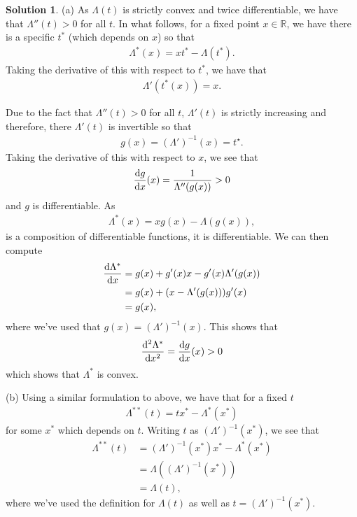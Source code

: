 \documentclass[12pt]{article}
\newcommand{\bbR}{\mathbb{R}}
\def\rd{{\rm d}}
\theoremstyle{definition}
\newtheorem{sol}{Solution}
\theoremstyle{remark}
\begin{document}
\begin{sol}
    (a) As $\Lambda(t)$ is strictly convex and twice differentiable, we have that $\Lambda''(t) > 0$ for all $t$. In what follows, for a fixed point $x \in \bbR$, we have there is a specific $t ^{*}$ (which depends on $x$) so that
    \begin{align*}
        \Lambda^{*}(x) = xt^{*} - \Lambda(t^{*}).
    \end{align*}
Taking the derivative of this with respect to $t^{*}$, we have that 
\begin{align*}
    \Lambda'(t^{*}(x)) = x.
\end{align*}

Due to the fact that $\Lambda''(t) > 0$ for all $t$, $\Lambda'(t)$ is strictly increasing and therefore, there  $\Lambda'(t)$ is invertible so that 
 \begin{align*}
     g(x) = (\Lambda')^{-1}(x) = t^{\star}.
\end{align*}
Taking the derivative of this with respect to $x$, we see that
\begin{align*}
    \frac{\rd g}{\rd x} (x) = \frac{1}{\Lambda''(g(x))} > 0
\end{align*}
and $g$ is differentiable. As 
\begin{align*}
    \Lambda^{*}(x) = x g(x) - \Lambda( g(x) ),
\end{align*}
is a composition of differentiable functions, it is differentiable. We can then compute
\begin{align*}
    \frac{\rd \Lambda^{*}}{\rd x} &= g(x) + g'(x)x - g'(x)\Lambda'(g(x))\\
                                  &= g(x) + (x - \Lambda'(g(x)) ) g'(x)\\
                                  &= g(x),
\end{align*}
where we've used that $g(x) = (\Lambda')^{-1}(x)$. This shows that 
\begin{align*}
   \frac{\rd^{2} \Lambda^{*}}{\rd x^{2}} = \frac{\rd g}{\rd x} (x) > 0
\end{align*}
which shows that $\Lambda^{*}$ is convex.

(b) Using a similar formulation to above, we have that for a fixed $t$
    \begin{align*}
        \Lambda^{**}(t) = t x^{*} - \Lambda^{*}(x^{*}) 
    \end{align*}
    for some $x^{*}$ which depends on $t$. Writing $t$ as $(\Lambda')^{-1}(x^{*})$, we see that
    \begin{align*}
        \Lambda^{**}(t) &= (\Lambda')^{-1}(x^{*}) x^{*} - \Lambda^{*}(x^{*}) \\
                        &= \Lambda( (\Lambda')^{-1}(x^{*}) )\\
                        &= \Lambda(t),
    \end{align*}
    where we've used the definition for $\Lambda(t)$ as well as $t =  (\Lambda')^{-1}(x^{*})$.
\end{sol}
\end{document}
